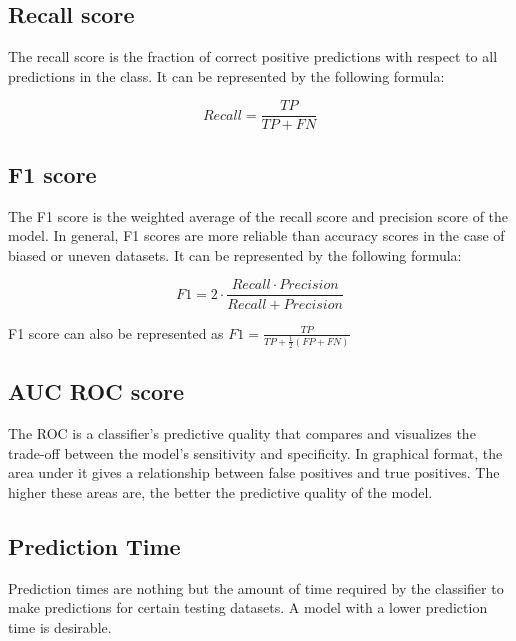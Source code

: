 \subsection{Recall score}\label{subsec:recall_score}

The recall score is the fraction of correct positive predictions with respect to all predictions in the class. It can be represented by the following formula:

\begin{equation}\label{eq:recall_score}
  Recall = \frac{TP}{TP+FN}
\end{equation}

\subsection{F1 score}\label{subsec:f1_score}

The F1 score is the weighted average of the recall score and precision score of the model. In general, F1 scores are more reliable than accuracy scores in the case of biased or uneven datasets. It can be represented by the following formula:

\begin{equation}\label{eq:f1_score}
  F1 = 2 \cdot \frac{Recall \cdot Precision}{Recall + Precision}
\end{equation}

F1 score can also be represented as
$F1 = \frac{TP}{TP+\frac{1}{2}(FP+FN)}$

\subsection{AUC ROC score}\label{subsec:auc_roc_score}

The ROC is a classifier's predictive quality that compares and visualizes the trade-off between the model's sensitivity and specificity. In graphical format, the area under it gives a relationship between false positives and true positives. The higher these areas are, the better the predictive quality of the model.

\subsection{Prediction Time}\label{subsec:prediction_time}

Prediction times are nothing but the amount of time required by the classifier to make predictions for certain testing datasets. A model with a lower prediction time is desirable.

